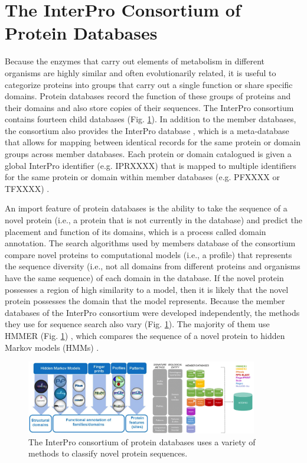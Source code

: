 \section{The InterPro Consortium of Protein Databases} \label{InterProDatabases}

Because the enzymes that carry out elements of metabolism in different organisms are highly similar and often evolutionarily related, it is useful to categorize proteins into groups that carry out a single function or share specific domains. Protein databases record the function of these groups of proteins and their domains and also store copies of their sequences. The InterPro consortium \cite{apweiler2000interpro,hunter2008interpro,Hunter2009} contains fourteen child databases \cite{finn2016interpro,Hunter2009} (Fig. \ref{fig:interpro-databases}). In addition to the member databases, the consortium also provides the InterPro database \cite{hunter2008interpro,finn2016interpro}, which is a meta-database that allows for mapping between identical records for the same protein or domain groups across member databases. Each protein or domain catalogued is given a global InterPro identifier (e.g. IPRXXXX) that is mapped to multiple identifiers for the same protein or domain within member databases (e.g. PFXXXX or TFXXXX) \cite{hunter2008interpro,finn2016interpro}.

An import feature of protein databases is the ability to take the sequence of a novel protein (i.e., a protein that is not currently in the database) and predict the placement and function of its domains, which is a process called domain annotation. The search algorithms used by members database of the consortium compare novel proteins to computational models (i.e., a profile) that represents the sequence diversity (i.e., not all domains from different proteins and organisms have the same sequence) of each domain in the database. If the novel protein possesses a region of high similarity to a model, then it is likely that the novel protein possesses the domain that the model represents. Because the member databases of the InterPro consortium were developed independently, the methods they use for sequence search also vary (Fig. \ref{fig:interpro-databases}). The majority of them use HMMER (Fig. \ref{fig:interpro-databases}) \cite{eddy2011accelerated}, which compares the sequence of a novel protein to hidden Markov models (HMMs) \cite{de2007hidden}.

\begin{figure}[!ht]
  \centering
	\includegraphics[width=0.90\textwidth]{media/InterPro.png}
	 \caption{The InterPro consortium of protein databases uses a variety of methods to classify novel protein sequences.}
	 \label{fig:interpro-databases}
\end{figure}

